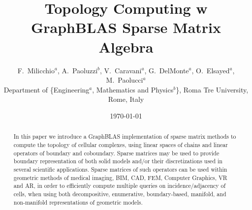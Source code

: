 \documentclass[]{article}
\title{%
Topology Computing w GraphBLAS Sparse Matrix Algebra
}
\author{F.~Milicchio$^a$, A.~Paoluzzi$^b$, 
 V.~Caravani$^a$, G.~DelMonte$^a$, O.~Elsayed$^a$, M.~Paolucci$^a$\\
\small{Department of \{Engineering$^a$, Mathematics and Physics$^b$\}, Roma Tre University, Rome, Italy}\\[3mm]
}
\date{\today}
\begin{document}
\maketitle


\begin{abstract}
In this paper we introduce a GraphBLAS implementation of sparse matrix methods to compute the topology of cellular complexes, using linear spaces of chains and linear operators of boundary and coboundary. Sparse matrices may be used to provide boundary representation of both solid models and/or their discretizations used in several scientific applications. Sparse matrices of such operators can be used within geometric methods of medical imaging, BIM, CAD, FEM, Computer Graphics, VR and AR, in order to efficiently compute multiple queries on incidence/adjacency of  cells, when using both decompositive, enumerative, boundary-based, manifold, and non-manifold representations of geometric models.
\end{abstract}

\tableofcontents














\end{document}
